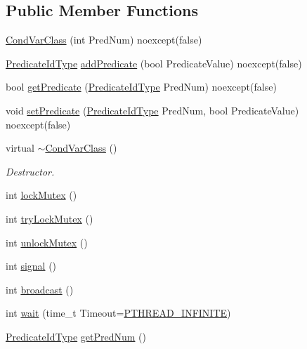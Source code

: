 \subsection*{Public Member Functions}
\begin{DoxyCompactItemize}
\item 
\hyperlink{classCondVarClass_a03da5f7409d43577a5831dc350e3e2dd}{Cond\+Var\+Class} (int Pred\+Num) noexcept(false)
\item 
\hyperlink{classCondVarClass_a8e27f99972b8b95f064d6657a4583a5b}{Predicate\+Id\+Type} \hyperlink{classCondVarClass_a18c457bbb27be21285f9cc52a5b8e877}{add\+Predicate} (bool Predicate\+Value) noexcept(false)
\item 
bool \hyperlink{classCondVarClass_a9511628fc388d3e8a3d35bd2d9daacb7}{get\+Predicate} (\hyperlink{classCondVarClass_a8e27f99972b8b95f064d6657a4583a5b}{Predicate\+Id\+Type} Pred\+Num) noexcept(false)
\item 
void \hyperlink{classCondVarClass_a6858cc038d21b6ab4432f2259a1e0a08}{set\+Predicate} (\hyperlink{classCondVarClass_a8e27f99972b8b95f064d6657a4583a5b}{Predicate\+Id\+Type} Pred\+Num, bool Predicate\+Value) noexcept(false)
\item 
virtual \hyperlink{classCondVarClass_ac6095148586b51ec4b2425628e21e225}{$\sim$\+Cond\+Var\+Class} ()
\begin{DoxyCompactList}\small\item\em Destructor. \end{DoxyCompactList}\item 
int \hyperlink{classCondVarClass_a23809969d99080860b737fca1a5167af}{lock\+Mutex} ()
\item 
int \hyperlink{classCondVarClass_adf84284d765eab42cee949e94c945678}{try\+Lock\+Mutex} ()
\item 
int \hyperlink{classCondVarClass_a10ccd0a73746e5c4bf66157468ae8bf5}{unlock\+Mutex} ()
\item 
int \hyperlink{classCondVarClass_ab17290f0dcf8c4c9dd31ef2739a073ba}{signal} ()
\item 
int \hyperlink{classCondVarClass_a31519d403ae332e86d9d93defe6031da}{broadcast} ()
\item 
int \hyperlink{classCondVarClass_a7d8ef7832aff2cb2b4a627beb4707c6b}{wait} (time\+\_\+t Timeout=\hyperlink{PThreadClassLib_8h_a9d2d74d73cb5d069fbfcbcfebf42bd6e}{P\+T\+H\+R\+E\+A\+D\+\_\+\+I\+N\+F\+I\+N\+I\+TE})
\item 
\hyperlink{classCondVarClass_a8e27f99972b8b95f064d6657a4583a5b}{Predicate\+Id\+Type} \hyperlink{classCondVarClass_adf7a6eb861c7fdd02767239680726456}{get\+Pred\+Num} ()
\end{DoxyCompactItemize}
